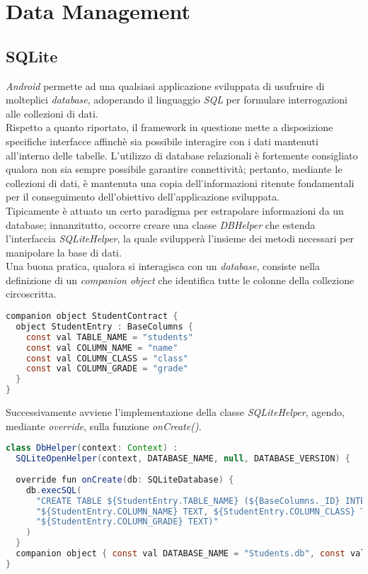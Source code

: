 \documentclass{article}
\begin{document}
\pagestyle{empty}

\section*{Data Management}
\large
\subsection*{SQLite}
\textit{Android} permette ad una qualsiasi applicazione sviluppata di usufruire di molteplici \textit{database}, adoperando il linguaggio \textit{SQL} per formulare interrogazioni alle collezioni di dati.\vspace*{7pt}\\
Rispetto a quanto riportato, il framework in questione mette a disposizione specifiche interfacce affinchè sia possibile interagire con i dati mantenuti all'interno delle tabelle. L'utilizzo di database relazionali è fortemente consigliato qualora non sia sempre possibile garantire connettività; pertanto, mediante le collezioni di dati, è mantenuta una copia dell'informazioni ritenute fondamentali per il conseguimento dell'obiettivo dell'applicazione sviluppata.\vspace*{7pt}\\
Tipicamente è attuato un certo paradigma per estrapolare informazioni da un database; innanzitutto, occorre creare una classe \textit{DBHelper} che estenda l'interfaccia \textit{SQLiteHelper}, la quale svilupperà l'insieme dei metodi necessari per manipolare la base di dati.\vspace*{7pt}\\
Una buona pratica, qualora si interagisca con un \textit{database}, consiste nella definizione di un \textit{companion object} che identifica tutte le colonne della collezione circoscritta.
\begin{lstlisting}[language=JAVA]
companion object StudentContract {
  object StudentEntry : BaseColumns {
    const val TABLE_NAME = "students"
    const val COLUMN_NAME = "name"
    const val COLUMN_CLASS = "class"
    const val COLUMN_GRADE = "grade"
  }
}
\end{lstlisting}
Successivamente avviene l'implementazione della classe \textit{SQLiteHelper}, agendo, mediante \textit{override}, sulla funzione \textit{onCreate()}.
\begin{lstlisting}[language=JAVA]
class DbHelper(context: Context) :
  SQLiteOpenHelper(context, DATABASE_NAME, null, DATABASE_VERSION) {
  
  override fun onCreate(db: SQLiteDatabase) {
    db.execSQL(
      "CREATE TABLE ${StudentEntry.TABLE_NAME} (${BaseColumns._ID} INTEGER PRIMARY KEY, " +
      "${StudentEntry.COLUMN_NAME} TEXT, ${StudentEntry.COLUMN_CLASS} TEXT," +
      "${StudentEntry.COLUMN_GRADE} TEXT)"
    )
  }
  companion object { const val DATABASE_NAME = "Students.db", const val DATABASE_VERSION = 1 }
}
\end{lstlisting}
\end{document}
